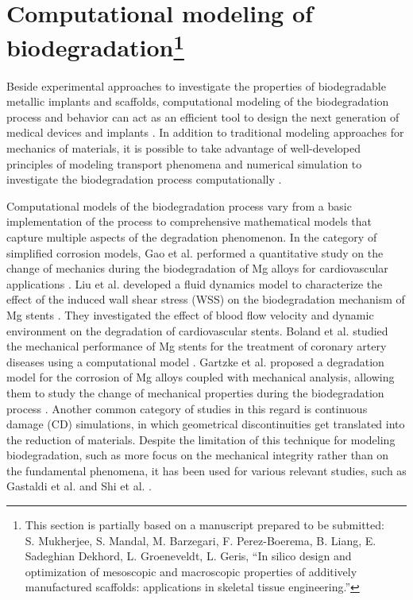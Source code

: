 \section[Computational modeling of biodegradation]{Computational modeling of biodegradation\footnote{This section is partially based on a manuscript prepared to be submitted:\\S. Mukherjee, S. Mandal, M. Barzegari, F. Perez-Boerema, B. Liang, E. Sadeghian Dekhord, L. Groeneveldt, L. Geris, ``In silico design and optimization of mesoscopic and macroscopic properties of additively manufactured scaffolds: applications in skeletal tissue engineering.''}}


Beside experimental approaches to investigate the properties of biodegradable metallic implants and scaffolds, computational modeling of the biodegradation process and behavior can act as an efficient tool to design the next generation of medical devices and implants \cite{Boland2015}. In addition to traditional modeling approaches for mechanics of materials, it is possible to take advantage of well-developed principles of modeling transport phenomena and numerical simulation to investigate the biodegradation process computationally \cite{SanzHerrera2019}.

Computational models of the biodegradation process vary from a basic implementation of the process to comprehensive mathematical models that capture multiple aspects of the degradation phenomenon. In the category of simplified corrosion models, Gao et al. performed a quantitative study on the change of mechanics during the biodegradation of Mg alloys for cardiovascular applications \cite{Gao2018}. Liu et al. developed a fluid dynamics model to characterize the effect of the induced wall shear stress (WSS) on the biodegradation mechanism of Mg stents \cite{Liu2018}. They investigated the effect of blood flow velocity and dynamic environment on the degradation of cardiovascular stents. Boland et al. studied the mechanical performance of Mg stents for the treatment of coronary artery diseases using a computational model \cite{Boland2019}. Gartzke et al. proposed a degradation model for the corrosion of Mg alloys coupled with mechanical analysis, allowing them to study the change of mechanical properties during the biodegradation process \cite{Gartzke2020}. Another common category of studies in this regard is continuous damage (CD) simulations, in which geometrical discontinuities get translated into the reduction of materials. Despite the limitation of this technique for modeling biodegradation, such as more focus on the mechanical integrity rather than on the fundamental phenomena, it has been used for various relevant studies, such as Gastaldi et al. \cite{Gastaldi2011} and Shi et al. \cite{Shi2021}. 

